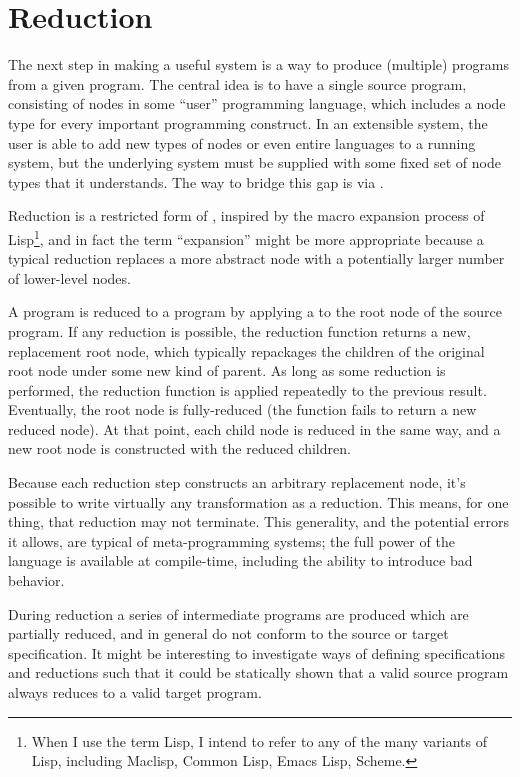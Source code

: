 \section{Reduction}\label{reduction}
The next step in making a useful system is a way to produce (multiple)  programs from a given  program. The central idea is to have a single source program, consisting of nodes in some ``user'' programming language, which includes a node type for every important programming construct. In an extensible system, the user is able to add new types of nodes or even entire languages to a running system, but the underlying system must be supplied with some fixed set of node types that it understands. The way to bridge this gap is via .

Reduction is a restricted form of , inspired by the macro expansion process of Lisp\footnote{When I use the term Lisp, I intend to refer to any of the many variants of Lisp, including Maclisp, Common Lisp, Emacs Lisp, Scheme.}, and in fact the term ``expansion'' might be more appropriate because a typical reduction replaces a more abstract node with a potentially larger number of lower-level nodes.

A  program is reduced to a  program by applying a  to the root node of the source program. If any reduction is possible, the reduction function returns a new, replacement root node, which typically repackages the children of the original root node under some new kind of parent. As long as some reduction is performed, the reduction function is applied repeatedly to the previous result. Eventually, the root node is fully-reduced (the function fails to return a new reduced node). At that point, each child node is reduced in the same way, and a new root node is constructed with the reduced children. 

Because each reduction step constructs an arbitrary replacement node, it's possible to write virtually any transformation as a reduction. This means, for one thing, that reduction may not terminate. This generality, and the potential errors it allows, are typical of meta-programming systems; the full power of the language is available at compile-time, including the ability to introduce bad behavior.

During reduction a series of intermediate programs are produced which are partially reduced, and in general do not conform to the source or target specification. It might be interesting to investigate ways of defining specifications and reductions such that it could be statically shown that a valid source program always reduces to a valid target program.

